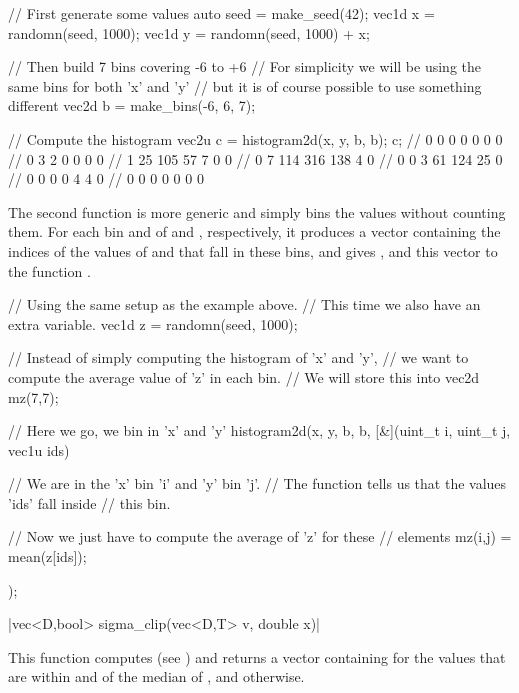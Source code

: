 \begin{example}
\begin{cppcode}
// First generate some values
auto seed = make_seed(42);
vec1d x = randomn(seed, 1000);
vec1d y = randomn(seed, 1000) + x;

// Then build 7 bins covering -6 to +6
// For simplicity we will be using the same bins for both 'x' and 'y'
// but it is of course possible to use something different
vec2d b = make_bins(-6, 6, 7);

// Compute the histogram
vec2u c = histogram2d(x, y, b, b);
c;
//   0   0   0   0   0   0   0
//   0   3   2   0   0   0   0
//   1   25  105 57  7   0   0
//   0   7   114 316 138 4   0
//   0   0   3   61  124 25  0
//   0   0   0   0   4   4   0
//   0   0   0   0   0   0   0
\end{cppcode}
\end{example}

The second  function is more generic and simply bins the values without counting them. For each bin  and  of  and , respectively, it produces a vector containing the indices of the values of  and  that fall in these bins, and gives ,  and this vector to the function .

\begin{example}
\begin{cppcode}
// Using the same setup as the example above.
// This time we also have an extra variable.
vec1d z = randomn(seed, 1000);

// Instead of simply computing the histogram of 'x' and 'y',
// we want to compute the average value of 'z' in each bin.
// We will store this into
vec2d mz(7,7);

// Here we go, we bin in 'x' and 'y'
histogram2d(x, y, b, b, [&](uint_t i, uint_t j, vec1u ids) {
    // We are in the 'x' bin 'i' and 'y' bin 'j'.
    // The function tells us that the values 'ids' fall inside
    // this bin.

    // Now we just have to compute the average of 'z' for these
    // elements
    mz(i,j) = mean(z[ids]);
});
\end{cppcode}
\end{example}

\funcitem \cppinline|vec<D,bool> sigma_clip(vec<D,T> v, double x)| 

This function computes  (see ) and returns a vector containing  for the values that are within  and  of the median of , and  otherwise.

